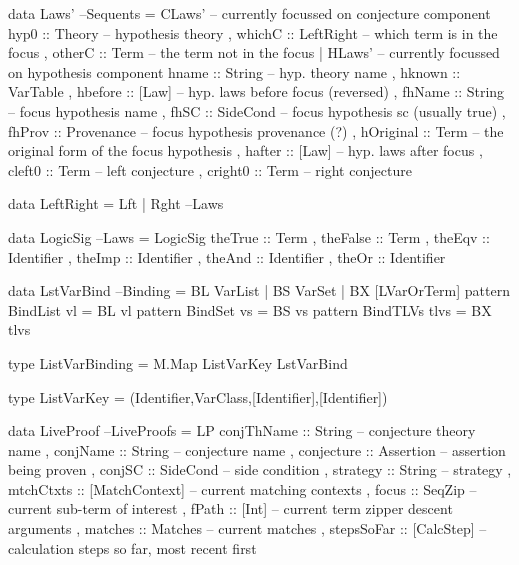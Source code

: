 \begin{code}
data Laws'                                                          --Sequents
  = CLaws' { -- currently focussed on conjecture component
      hyp0  :: Theory -- hypothesis theory
    , whichC :: LeftRight -- which term is in the focus
    , otherC :: Term  -- the term not in the focus
    }
  | HLaws' { -- currently focussed on hypothesis component
      hname     :: String -- hyp. theory name
    , hknown    :: VarTable
    , hbefore   :: [Law] -- hyp. laws before focus (reversed)
    , fhName    :: String -- focus hypothesis name
    , fhSC      :: SideCond -- focus hypothesis sc (usually true)
    , fhProv    :: Provenance -- focus hypothesis provenance (?)
    , hOriginal :: Term -- the original form of the focus hypothesis
    , hafter    :: [Law] -- hyp. laws after focus
    , cleft0    :: Term -- left conjecture
    , cright0   :: Term -- right conjecture
    }
\end{code}


\begin{code}
data LeftRight = Lft | Rght                                             --Laws
\end{code}

\begin{code}
data LogicSig                                                           --Laws
  = LogicSig
     { theTrue  :: Term
     , theFalse :: Term
     , theEqv   :: Identifier
     , theImp   :: Identifier
     , theAnd   :: Identifier
     , theOr    :: Identifier
     }
\end{code}

\begin{code}
data LstVarBind                                                      --Binding
 = BL  VarList
 | BS  VarSet
 | BX  [LVarOrTerm]
pattern BindList vl      =  BL vl
pattern BindSet  vs      =  BS vs
pattern BindTLVs tlvs    =  BX tlvs
\end{code}

\begin{code}
type ListVarBinding = M.Map ListVarKey LstVarBind
\end{code}

\begin{code}
type ListVarKey = (Identifier,VarClass,[Identifier],[Identifier])
\end{code}

\begin{code}
data LiveProof                                                    --LiveProofs
  = LP {
      conjThName :: String -- conjecture theory name
    , conjName :: String -- conjecture name
    , conjecture :: Assertion -- assertion being proven
    , conjSC :: SideCond -- side condition
    , strategy :: String -- strategy
    , mtchCtxts :: [MatchContext] -- current matching contexts
    , focus :: SeqZip  -- current sub-term of interest
    , fPath :: [Int] -- current term zipper descent arguments
    , matches :: Matches -- current matches
    , stepsSoFar :: [CalcStep]  -- calculation steps so far, most recent first
    }
\end{code}

